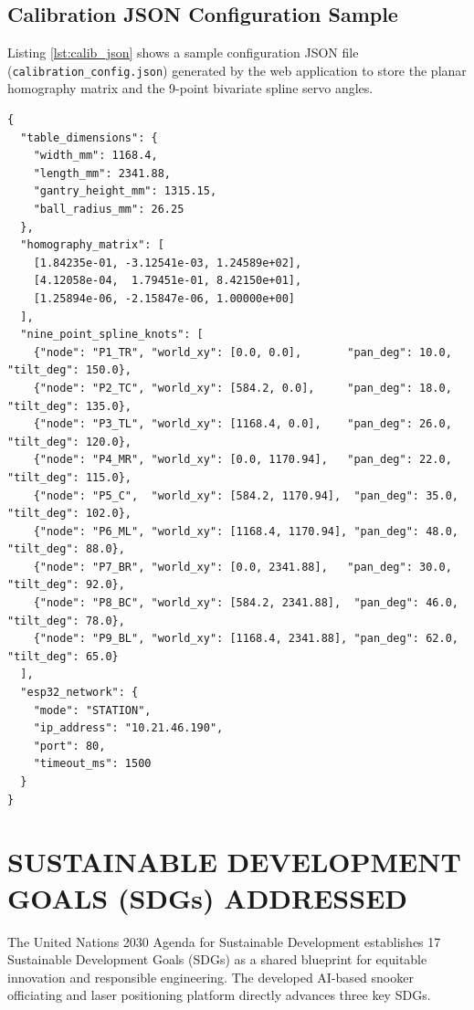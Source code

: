 \section{Calibration JSON Configuration Sample}
Listing \ref{lst:calib_json} shows a sample configuration JSON file (\texttt{calibration\_config.json}) generated by the web application to store the planar homography matrix and the 9-point bivariate spline servo angles.

\begin{lstlisting}[caption={Sample Calibration JSON Configuration File}, label={lst:calib_json}]
{
  "table_dimensions": {
    "width_mm": 1168.4,
    "length_mm": 2341.88,
    "gantry_height_mm": 1315.15,
    "ball_radius_mm": 26.25
  },
  "homography_matrix": [
    [1.84235e-01, -3.12541e-03, 1.24589e+02],
    [4.12058e-04,  1.79451e-01, 8.42150e+01],
    [1.25894e-06, -2.15847e-06, 1.00000e+00]
  ],
  "nine_point_spline_knots": [
    {"node": "P1_TR", "world_xy": [0.0, 0.0],       "pan_deg": 10.0,  "tilt_deg": 150.0},
    {"node": "P2_TC", "world_xy": [584.2, 0.0],     "pan_deg": 18.0,  "tilt_deg": 135.0},
    {"node": "P3_TL", "world_xy": [1168.4, 0.0],    "pan_deg": 26.0,  "tilt_deg": 120.0},
    {"node": "P4_MR", "world_xy": [0.0, 1170.94],   "pan_deg": 22.0,  "tilt_deg": 115.0},
    {"node": "P5_C",  "world_xy": [584.2, 1170.94],  "pan_deg": 35.0,  "tilt_deg": 102.0},
    {"node": "P6_ML", "world_xy": [1168.4, 1170.94], "pan_deg": 48.0,  "tilt_deg": 88.0},
    {"node": "P7_BR", "world_xy": [0.0, 2341.88],   "pan_deg": 30.0,  "tilt_deg": 92.0},
    {"node": "P8_BC", "world_xy": [584.2, 2341.88],  "pan_deg": 46.0,  "tilt_deg": 78.0},
    {"node": "P9_BL", "world_xy": [1168.4, 2341.88], "pan_deg": 62.0,  "tilt_deg": 65.0}
  ],
  "esp32_network": {
    "mode": "STATION",
    "ip_address": "10.21.46.190",
    "port": 80,
    "timeout_ms": 1500
  }
}
\end{lstlisting}

\newpage
\chapter{SUSTAINABLE DEVELOPMENT GOALS (SDGs) ADDRESSED}

The United Nations 2030 Agenda for Sustainable Development establishes 17 Sustainable Development Goals (SDGs) as a shared blueprint for equitable innovation and responsible engineering. The developed AI-based snooker officiating and laser positioning platform directly advances three key SDGs.

